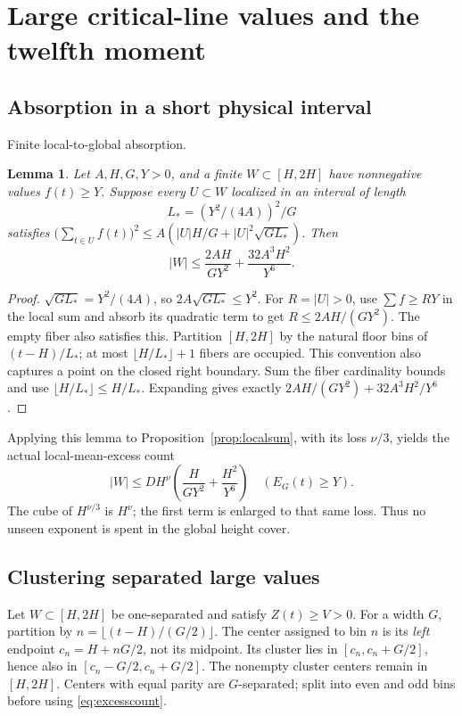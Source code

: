 \documentclass[11pt,a4paper]{article}
\numberwithin{equation}{section}
\newtheorem{lemma}[theorem]{Lemma}
\theoremstyle{definition}
\newcommand{\zabs}{Z}
\begin{document}
\section{Large critical-line values and the twelfth moment}
\label{sec:peaks}
\subsection{Absorption in a short physical interval}
\par\medskip\noindent Finite local-to-global absorption.
\begin{lemma}\label{lem:absorption}
Let $A,H,G,Y>0$, and a finite $W\subset[H,2H]$ have nonnegative values
$f(t)\ge Y$. Suppose every $U\subset W$ localized in an interval of length
\[
 L_*=(Y^2/(4A))^2/G
\]
satisfies
$\bigl(\sum_{t\in U}f(t)\bigr)^2\le A(|U|H/G+|U|^2\sqrt{GL_*})$.
Then
\[
 |W|\le\frac{2AH}{GY^2}+\frac{32A^3H^2}{Y^6}.
\]
\end{lemma}
\begin{proof}
$\sqrt{GL_*}=Y^2/(4A)$, so $2A\sqrt{GL_*}\le Y^2$.
For $R=|U|>0$, use $\sum f\ge RY$ in the local sum and absorb its
quadratic term to get $R\le2AH/(GY^2)$. The empty fiber also satisfies this.
Partition $[H,2H]$ by the natural floor bins of $(t-H)/L_*$;
at most $\lfloor H/L_*\rfloor+1$ fibers are occupied. This convention also
captures a point on the closed right boundary. Sum the fiber cardinality
bounds and use $\lfloor H/L_*\rfloor\le H/L_*$. Expanding gives exactly
$2AH/(GY^2)+32A^3H^2/Y^6$.
\end{proof}

Applying this lemma to Proposition~\ref{prop:localsum}, with its loss
$\nu/3$, yields the actual local-mean-excess count
\begin{equation}\label{eq:excesscount}
 |W|\le D H^\nu\left(\frac H{GY^2}+\frac{H^2}{Y^6}\right)
 \quad(E_G(t)\ge Y).
\end{equation}
The cube of $H^{\nu/3}$ is $H^\nu$; the first term is enlarged to that same
loss. Thus no unseen exponent is spent in the global height cover.

\subsection{Clustering separated large values}
Let $W\subset[H,2H]$ be one-separated and satisfy $\zabs(t)\ge V>0$.
For a width $G$, partition by
$n=\lfloor(t-H)/(G/2)\rfloor$. The center assigned to bin $n$ is its
\emph{left} endpoint $c_n=H+nG/2$, not its midpoint. Its cluster lies in
$[c_n,c_n+G/2]$, hence also in $[c_n-G/2,c_n+G/2]$.
The nonempty cluster centers remain in $[H,2H]$. Centers with equal parity
are $G$-separated; split into even and odd bins before using
\eqref{eq:excesscount}.
\end{document}
